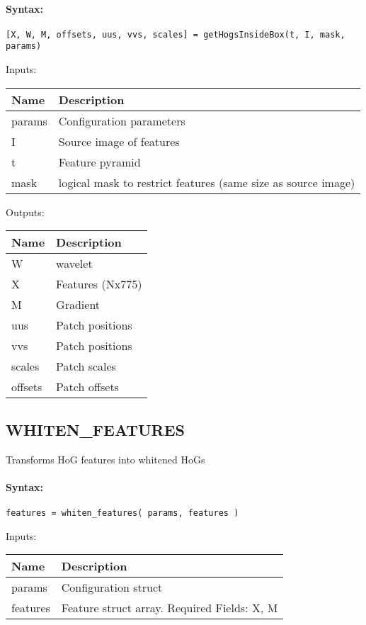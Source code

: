 \paragraph{Syntax:} \verb|[X, W, M, offsets, uus, vvs, scales] = getHogsInsideBox(t, I, mask, params)|

\bigskip
Inputs:

\begin{tabular}{|p{}|p{}|}
\hline
\textbf{Name} & \textbf{Description} \\
\hline \hline
params & Configuration parameters  \\ \hline
I & Source image of features  \\ \hline
t & Feature pyramid  \\ \hline
mask & logical mask to restrict features (same size as source image)  \\ \hline
\end{tabular}

\bigskip
Outputs:

\begin{tabular}{|p{}|p{}|}
\hline
\textbf{Name} & \textbf{Description} \\
\hline \hline
W & wavelet  \\ \hline
X & Features (Nx775)  \\ \hline
M & Gradient  \\ \hline
uus & Patch positions  \\ \hline
vvs & Patch positions  \\ \hline
scales & Patch scales  \\ \hline
offsets & Patch offsets  \\ \hline
\end{tabular}

\subsection{WHITEN\_FEATURES}

Transforms HoG features into whitened HoGs

\paragraph{Syntax:} \verb|features = whiten_features( params, features )|

\bigskip
Inputs:

\begin{tabular}{|p{}|p{}|}
\hline
\textbf{Name} & \textbf{Description} \\
\hline \hline
params & Configuration struct  \\ \hline
features & Feature struct array. Required Fields: X, M  \\ \hline
\end{tabular}

